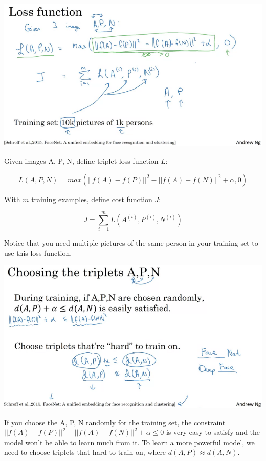 \documentclass{article}
\begin{document}
\begin{center}
\includegraphics[scale=0.4]{./images/triplet_loss_function.png}
\end{center}

\noindent Given images A, P, N, define triplet loss function \(L\):

\[L(A, P, N) = max(||f(A) - f(P)||^{2} - ||f(A) - f(N)||^{2} + \alpha, 0)\]

\noindent With \(m\) training examples, define cost function \(J\):

\[J = \sum_{i = 1}^{m} L(A^{(i)}, P^{(i)}, N^{(i)})\]

\noindent Notice that you need multiple pictures of the same person in your training set to use this loss function.

\begin{center}
\includegraphics[scale=0.4]{./images/triplet_choosing.png}
\end{center}

\noindent If you choose the A, P, N randomly for the training set, the constraint \(||f(A) - f(P)||^{2} - ||f(A) - f(N)||^{2} + \alpha \leq 0\) is very easy to satisfy and the model won't be able to learn much from it. To learn a more powerful model, we need to choose triplets that hard to train on, where \(d(A, P) \approx d(A, N)\).
\end{document}
